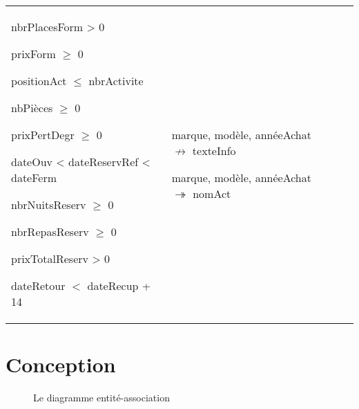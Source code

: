 \documentclass[12pt, a4paper]{article}
\begin{document}
\begin{table}[h]
\begin{tabularx}{\columnwidth}{>{\raggedright}XXXX}
nbrPlacesForm > 0

prixForm $\geq$ 0

positionAct $\leq$ nbrActivite

nbPièces $\geq$ 0

prixPertDegr $\geq$ 0

dateOuv < dateReservRef < dateFerm

nbrNuitsReserv $\geq$ 0

nbrRepasReserv $\geq$ 0

prixTotalReserv > 0

dateRetour $<$ dateRecup + 14

& marque, modèle, annéeAchat $\not\rightarrow$ texteInfo

marque, modèle, annéeAchat $\twoheadrightarrow$ nomAct

& \\
\end{tabularx}
\end{table}

\section{Conception}
\begin{figure}[h]

\caption{Le diagramme entité-association}
\end{figure}
\end{document}
